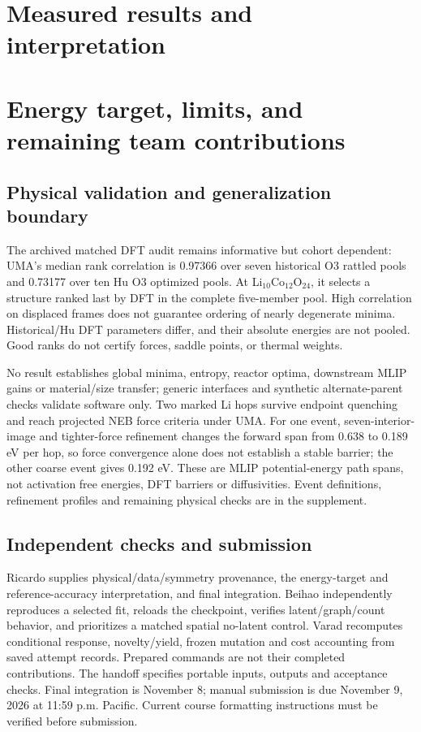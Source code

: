 \documentclass[10pt]{article}
\begin{document}
\section{Measured results and interpretation}

\newpage

\section{Energy target, limits, and remaining team contributions}


\subsection{Physical validation and generalization boundary}
The archived matched DFT audit remains informative but cohort dependent: UMA's
median rank correlation is 0.97366 over seven historical O3 rattled pools and
0.73177 over ten Hu O3 optimized pools. At Li$_{10}$Co$_{12}$O$_{24}$, it selects
a structure ranked last by DFT in the complete five-member pool. High correlation
on displaced frames does not guarantee ordering of nearly degenerate minima.
Historical/Hu DFT parameters differ, and their absolute energies are not pooled.
Good ranks do not certify forces, saddle points, or thermal weights.

No result establishes global minima, entropy, reactor optima, downstream MLIP
gains or material/size transfer; generic interfaces and synthetic alternate-parent
checks validate software only. Two marked Li hops survive endpoint quenching and
reach projected NEB force criteria under UMA. For one event, seven-interior-image
and tighter-force refinement changes the forward span from 0.638 to 0.189 eV per
hop, so force convergence alone does not establish a stable barrier; the other
coarse event gives 0.192 eV. These are MLIP potential-energy path spans, not
activation free energies, DFT barriers or diffusivities. Event definitions,
refinement profiles and remaining physical checks are in the supplement.

\subsection{Independent checks and submission}
Ricardo supplies physical/data/symmetry provenance, the energy-target and
reference-accuracy interpretation, and final integration. Beihao independently
reproduces a selected fit, reloads the checkpoint, verifies latent/graph/count
behavior, and prioritizes a matched spatial no-latent control. Varad recomputes
conditional response, novelty/yield, frozen mutation and cost accounting from
saved attempt records. Prepared commands are not their completed contributions.
The handoff specifies portable inputs, outputs and acceptance checks. Final
integration is November 8; manual submission is due November 9, 2026 at 11:59 p.m.
Pacific. Current course formatting instructions must be verified before submission.

\clearpage


\end{document}
